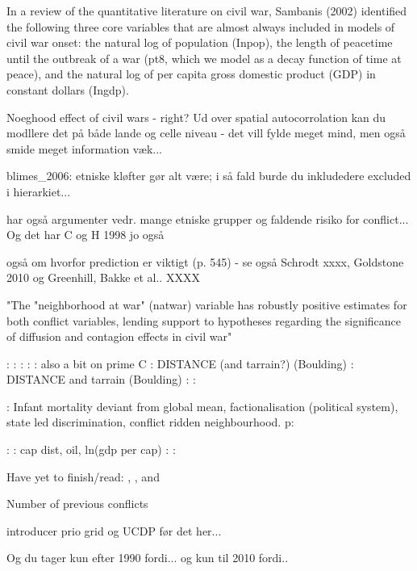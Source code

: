 In a review of the quantitative literature on civil war, Sambanis
(2002) identified the following three core variables that are almost always included
in models of civil war onset: the natural log of population (Inpop), the length of
peacetime until the outbreak of a war (pt8, which we model as a decay function of
time at peace), and the natural log of per capita gross domestic product (GDP) in
constant dollars (Ingdp).

Noeghood effect of civil wars - right? Ud over spatial autocorrolation kan du modllere det på både lande og celle niveau - det vill fylde meget mind, men også smide meget information væk...

blimes\_2006: etniske kløfter gør alt være; i så fald burde du inkludedere excluded i hierarkiet...

har også argumenter vedr. mange etniske grupper og faldende risiko for conflict... Og det har C og H 1998 jo også

også om hvorfor prediction er viktigt (p. 545) - se også Schrodt xxxx, Goldstone 2010 og Greenhill, Bakke et al.. XXXX

"The "neighborhood at war" (natwar) variable has robustly positive estimates for
both conflict variables, lending support to hypotheses regarding the significance of
diffusion and contagion effects in civil war"

\cite{Kalyvas_2007} :
\cite{Vreeland_2008} :
\cite{Cederman_Gleditsch_2009} :
\cite{Cunningham_Gleditsch_Salehyan_2009} :
\cite{Hegre_Oestby_Raleigh_2009} : also a bit on prime C
\cite{Buhaug_Gates_Lujala_2009} : DISTANCE (and tarrain?) (Boulding)
\cite{Cederman_Buhaug_Roed_2009} : DISTANCE and tarrain (Boulding)
\cite{Beardsley_McQuinn_2009} :
\cite{Weidmann_2009} :

\cite{Goldstone_2010} : Infant mortality deviant from global mean, factionalisation (political system), state led discrimination, conflict ridden neighbourhood. p:  

\cite{Blattman_Miguel_2010} :
\cite{Buhaug_2010} : cap dist, oil, ln(gdp per cap)
\cite{Cederman_Weidmann_Gleditsch_2011} :
\cite{Cederman_Gleditsch_Buhaug_2013}:  

Have yet to finish/read: \cite{Gurr_1970}, \cite{Skocpol_1979}, \cite{Kalyvas_2006} and 

\cite{Cederman_Gleditsch_Buhaug_2013} Number of previous conflicts

introducer prio grid og UCDP før det her...

Og du tager kun efter 1990 fordi...
og kun til 2010 fordi..

